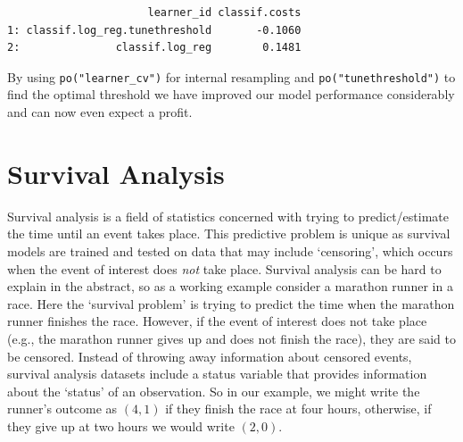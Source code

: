 \begin{Shaded}
\begin{Highlighting}[]
\OtherTok{=} \NormalTok{(}\NormalTok{, }\NormalTok{(}\NormalTok{, } \NormalTok{))}
\OtherTok{=}\SpecialCharTok{\%\textgreater{}\textgreater{}\%} \NormalTok{(}\NormalTok{, }

\OtherTok{=} \NormalTok{(}\NormalTok{(}\NormalTok{))}
\OtherTok{=} \NormalTok{(}
  \NormalTok{(}\NormalTok{, } \NormalTok{)))}
\SpecialCharTok{$}\NormalTok{(msr\_costs)[, }\NormalTok{(}\NormalTok{, }\NormalTok{)]}
\end{Highlighting}
\end{Shaded}

\begin{verbatim}
                      learner_id classif.costs
1: classif.log_reg.tunethreshold       -0.1060
2:               classif.log_reg        0.1481
\end{verbatim}

By using \texttt{po("learner\_cv")} for internal resampling and
\texttt{po("tunethreshold")} to find the optimal threshold we have
improved our model performance considerably and can now even expect a
profit.

\hypertarget{sec-survival}{%
\section{Survival Analysis}\label{sec-survival}}

Survival analysis is a field of statistics
concerned with trying to predict/estimate the time until an event takes
place. This predictive problem is unique as survival models are trained
and tested on data that may include `censoring', which occurs when the
event of interest does \emph{not} take place. Survival analysis can be
hard to explain in the abstract, so as a working example consider a
marathon runner in a race. Here the `survival problem' is trying to
predict the time when the marathon runner finishes the race. However, if
the event of interest does not take place (e.g., the marathon runner
gives up and does not finish the race), they are said to be censored.
Instead of throwing away information about censored events, survival
analysis datasets include a status variable that provides information
about the `status' of an observation. So in our example, we might write
the runner's outcome as \((4, 1)\) if they finish the race at four
hours, otherwise, if they give up at two hours we would write
\((2, 0)\).

